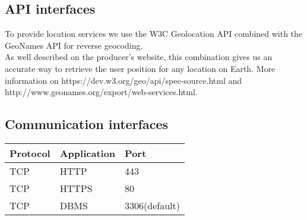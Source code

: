 \subsection{API interfaces}
To provide location services we use the W3C Geolocation API combined with the GeoNames API for reverse geocoding. 
\\As well described on the producer's website, this combination gives us an accurate way to retrieve the user position for any location on Earth. More information on https://dev.w3.org/geo/api/spec-source.html and http://www.geonames.org/export/web-services.html.

\subsection{Communication interfaces}
\begin{center}
	\begin{tabular}{|l|l|l|}
	    \hline
	    Protocol & Application & Port \\\hline
	    \hline
	    TCP & HTTP & 443 \\\hline
	    TCP & HTTPS & 80 \\\hline
	    TCP & DBMS & 3306(default) \\\hline
	\end{tabular}
\end{center}